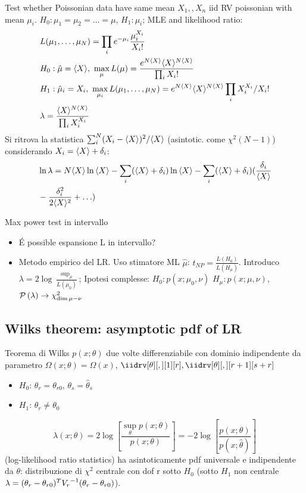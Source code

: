 \documentclass[asd-beamer.tex]{subfiles}%
\begin{document}
\begin{wordonframe}{Test whether Poissonian data have same mean}
$X_1,,X_n$ iid RV poissonian with mean $\mu_i$. $H_0: \mu_1=\mu_2=\ldots=\mu$, $H_1: \mu_i$; MLE and likelihood ratio:
\begin{align*}
&L(\mu_1,\ldots,\mu_N)=\prod_i\exp{-\mu_i}\frac{\mu_i^{X_i}}{X_i!}\\
&H_0: \hat{\mu}=\exv{X},\ \max_{\mu}L(\mu)=\frac{\exp{N\exv{X}}\exv{X}\expy{N\exv{X}}}{\prod_iX_i!}\\
&H_1: \hat{\mu}_i=X_i,\ \max_{\mu_i}L(\mu_1,\ldots,\mu_N)=\exp{N\exv{X}}\exv{X}\expy{N\exv{X}}\prod_iX_i\expy{X_i}/X_i!\\
&\lambda=\frac{\exv{X}\expy{N\exv{X}}}{\prod_iX_i\expy{X_i}}
\end{align*}
Si ritrova la statistica $\sum_i^N(X_i-\langle X \rangle)^2/\langle X \rangle$ (asintotic. come $\chi^2(N-1)$) considerando $X_i=\langle X \rangle+\delta_i$:
\begin{align*}
&\ln{\lambda}=N\langle X \rangle\ln{\langle X \rangle}-\sum_i(\langle X \rangle+\delta_i)\ln{\langle X \rangle}-\sum_i(\langle X \rangle+\delta_i)(\frac{\delta_i}{\langle X \rangle}\\
&-\frac{\delta_i^2}{2\langle X \rangle^2}+\ldots)
\end{align*}
\end{wordonframe}

\begin{wordonframe}{Max power test in intervallo}
\begin{itemize}
\item \'E possible espansione L in intervallo?
\item Metodo empirico del LR. Uso stimatore ML $\hat{\mu}$: $t_{NP}=\frac{L(H_0)}{L(H_{\mu})}$. Introduco $\lambda=2\log{\frac{\sup_{\mu}}{L(\mu_0)}}$; Ipotesi complesse: $H_0: p(x;\mu_0,\nu)$ $H_{\mu}: p(x;\mu,\nu)$, $\operatorname{\mathcal{P}}{(\lambda)}\to \chi^2_{\dim{\mu-\nu}}$
\end{itemize}
\end{wordonframe}

\subsection{Wilks theorem: asymptotic pdf of LR}

\begin{frame}{Teorema di Wilks}\frameintoc
	$p(x;\theta)$ due volte differenziabile con dominio indipendente da parametro $\Omega(x;\theta)=\Omega(x)$, $\iidrv[\theta][,][1][r],\iidrv[\theta][,][r+1][s+r]$
	\begin{itemize}
		\item $H_0$: $\theta_r=\theta_{r0}$, $\theta_s=\hat{\theta}_s$
		\item $H_1$: $\theta_r\neq\theta_0$
	\end{itemize}
	\[\lambda(x;\theta)=2\log{[\frac{\sup_{\theta}{p(x;\theta)}}{p(x;\theta)}]}=-2\log{[\frac{p(x;\theta)}{p(x;\hat{\theta})}]}\] (log-likelihood ratio statistics) ha asintoticamente pdf universale e indipendente da $\theta$: distribuzione di $\chi^2$ centrale con dof r sotto $H_0$ (sotto $H_1$ non centrale $\lambda=(\theta_r-\theta_{r0})^T{V_r}^{-1}(\theta_r-\theta_{r0})$).
\end{frame}
\end{document}
